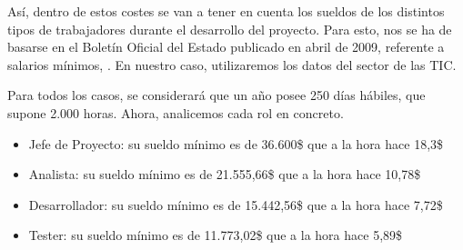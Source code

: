 Así, dentro de estos costes se van a tener en cuenta los sueldos de los distintos tipos de trabajadores durante el desarrollo del proyecto. Para esto, nos se ha de basarse en el Boletín Oficial del Estado publicado en abril de 2009, referente a salarios mínimos, \cite{boe_salarios}. En nuestro caso, utilizaremos los datos del sector de las TIC.

Para todos los casos, se considerará que un año posee 250 días hábiles, que supone 2.000 horas. Ahora, analicemos cada rol en concreto.

\begin{itemize}
    \item Jefe de Proyecto: su sueldo mínimo es de 36.600\$ que a la hora hace 18,3\$
    \item Analista: su sueldo mínimo es de 21.555,66\$ que a la hora hace 10,78\$
    \item Desarrollador: su sueldo mínimo es de 15.442,56\$ que a la hora hace 7,72\$
    \item Tester: su sueldo mínimo es de 11.773,02\$ que a la hora hace 5,89\$
\end{itemize}